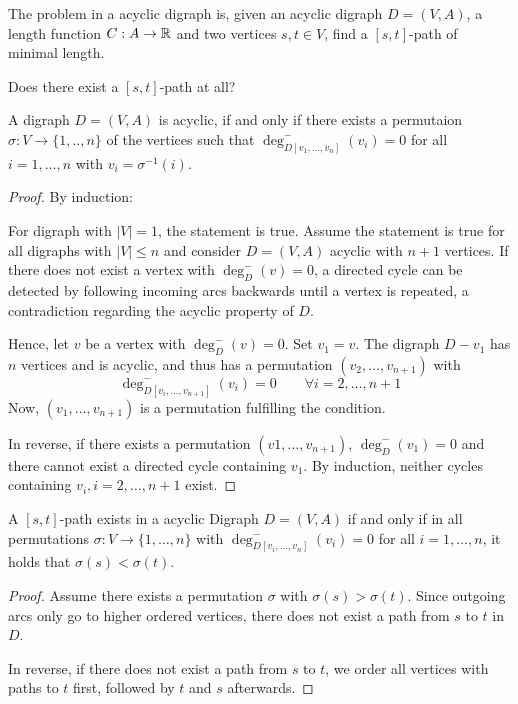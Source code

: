 \setcounter{section}{3}
\setcounter{subsection}{0}

\begin{defn}
	The  problem in a acyclic digraph is, given an acyclic digraph $D=(V,A)$, a length function $C: A\rightarrow \mathbb{R}$ and two vertices $s,t\in V$, find a $[s,t]$-path of minimal length.
\end{defn}

\begin{qstn}
Does there exist a $[s,t]$-path at all?
\end{qstn}
\begin{thm}
A digraph $D = (V, A)$ is acyclic, if and only if there exists a permutaion $\sigma : V \rightarrow \{ 1, .., n \}$ of the vertices such that $\deg^-_{D [v_1, …,  v_n]} (v_i) = 0$ for all $i = 1, …, n$ with $v_i = \sigma^{-1}(i)$.
\end{thm}
\begin{proof}
By induction:

For digraph with $| V |=1$, the statement is true. Assume the statement is true for all digraphs with $|V| \leq n$ and consider $D = (V, A)$ acyclic with $n+1$ vertices. 
If there does not exist a vertex with $\deg_D^-(v) = 0$, a directed cycle can be detected by following incoming arcs backwards until a vertex is repeated, a contradiction regarding the acyclic property of $D$.

Hence, let $v$ be a vertex with $\deg^-_D(v)=0$. Set $v_1 = v$. The digraph $D - v_1$ has $n$ vertices and is acyclic, and thus has a permutation $(v_2, …, v_{n+1})$ with
\[ \deg^-_{D[v_i, …, v_{n+1}]}(v_i) = 0 \qquad \forall i = 2, …, n+1 \]
Now, $(v_1, …, v_{n+1})$ is a permutation fulfilling the condition.

In reverse, if there exists a permutation $(v1, …, v_{n+1})$, $\deg^-_D(v_1) = 0$ and there cannot exist a directed cycle containing $v_1$. By induction, neither cycles containing $v_i, i = 2, …, n+1$ exist.
\end{proof}

\begin{thm}
A $[s,t]$-path exists in a acyclic Digraph $D = (V, A)$ if and only if in all permutations $\sigma: V \rightarrow \{ 1, …, n\}$ with $\deg^-_{D[v_i, …, v_n]}(v_i) = 0$ for all $i = 1, …, n$, it holds that $\sigma(s) < \sigma(t)$.
\end{thm}
\begin{proof}
Assume there exists a permutation $\sigma$ with $\sigma(s) > \sigma(t)$. Since outgoing arcs only go to higher ordered vertices, there does not exist a path from $s$ to $t$ in $D$.

In reverse, if there does not exist a path from $s$ to $t$, we order all vertices with paths to $t$ first, followed by $t$ and $s$ afterwards. 
\end{proof}

